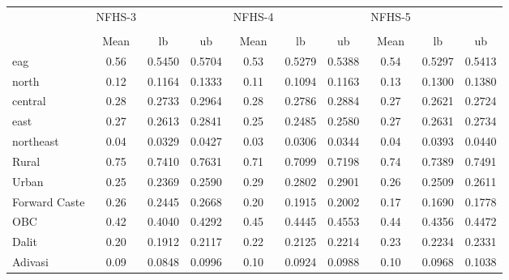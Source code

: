 {
\def\sym#1{\ifmmode^{#1}\else\(^{#1}\)\fi}
\begin{tabular}{l*{3}{ccc}}
\hline\hline
                    &      NFHS-3&            &            &      NFHS-4&            &            &      NFHS-5&            &            \\
                    &\multicolumn{3}{c}{}                  &\multicolumn{3}{c}{}                  &\multicolumn{3}{c}{}                  \\
                    &        Mean&          lb&          ub&        Mean&          lb&          ub&        Mean&          lb&          ub\\
\hline
eag                 &        0.56&      0.5450&      0.5704&        0.53&      0.5279&      0.5388&        0.54&      0.5297&      0.5413\\
north               &        0.12&      0.1164&      0.1333&        0.11&      0.1094&      0.1163&        0.13&      0.1300&      0.1380\\
central             &        0.28&      0.2733&      0.2964&        0.28&      0.2786&      0.2884&        0.27&      0.2621&      0.2724\\
east                &        0.27&      0.2613&      0.2841&        0.25&      0.2485&      0.2580&        0.27&      0.2631&      0.2734\\
northeast           &        0.04&      0.0329&      0.0427&        0.03&      0.0306&      0.0344&        0.04&      0.0393&      0.0440\\
Rural               &        0.75&      0.7410&      0.7631&        0.71&      0.7099&      0.7198&        0.74&      0.7389&      0.7491\\
Urban               &        0.25&      0.2369&      0.2590&        0.29&      0.2802&      0.2901&        0.26&      0.2509&      0.2611\\
Forward Caste       &        0.26&      0.2445&      0.2668&        0.20&      0.1915&      0.2002&        0.17&      0.1690&      0.1778\\
OBC                 &        0.42&      0.4040&      0.4292&        0.45&      0.4445&      0.4553&        0.44&      0.4356&      0.4472\\
Dalit               &        0.20&      0.1912&      0.2117&        0.22&      0.2125&      0.2214&        0.23&      0.2234&      0.2331\\
Adivasi             &        0.09&      0.0848&      0.0996&        0.10&      0.0924&      0.0988&        0.10&      0.0968&      0.1038\\

\end{tabular}}
